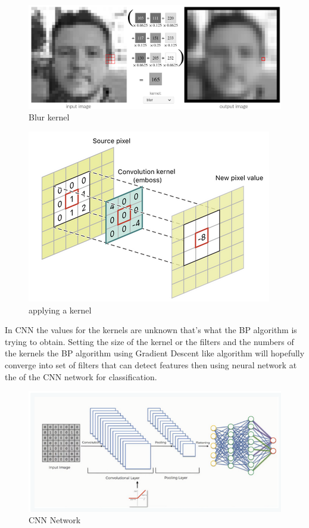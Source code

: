 \documentclass[10pt,twocolumn,letterpaper]{article}
\begin{document}
\begin{figure}[h!]
  \includegraphics[width=\linewidth]{blur.png}
  \caption{Blur kernel}
  \label{fig:blur}
\end{figure}

\begin{figure}[h!]
  \includegraphics[width=\linewidth]{blur_math.png}
  \caption{applying a kernel}
  \label{fig:blur_math}
\end{figure}

In CNN the values for the kernels are unknown that's what the BP algorithm is trying to obtain. Setting the size of the kernel or the filters and the numbers of the kernels the BP algorithm using Gradient Descent like algorithm will hopefully converge into set of filters that can detect features then using neural network at the of the CNN network for classification.
\begin{figure}[h!]
  \includegraphics[width=\linewidth]{cnn_nn.png}
  \caption{CNN Network}
  \label{fig:cnn_nn}
\end{figure}
\end{document}
